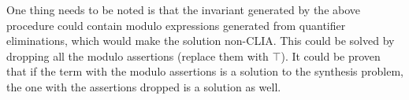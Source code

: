 \documentclass[conference]{IEEEtran}
\begin{document}
One thing needs to be noted is that the invariant generated by the above procedure could contain modulo expressions generated from quantifier eliminations, which would make the solution non-CLIA. This could be solved by dropping all the modulo assertions (replace them with $\top$). It could be proven that if the term with the modulo assertions is a solution to the synthesis problem, the one with the assertions dropped is a solution as well.

%
%
%
%
%


%
%
\end{document}
